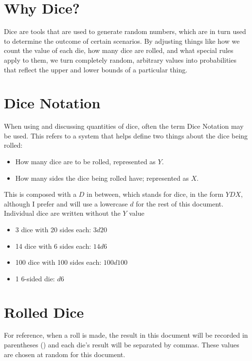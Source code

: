 \documentclass[../main.tex]{subfiles}
\begin{document}
    \section{Why Dice?}

    Dice are tools that are used to generate random numbers, which are in turn used to determine the outcome of certain scenarios. By adjusting things like how we count the value of each die, how many dice are rolled, and what special rules apply to them, we turn completely random, arbitrary values into probabilities that reflect the upper and lower bounds of a particular thing.

    \section{Dice Notation}

    When using and discussing quantities of dice, often the term Dice Notation may be used. This refers to a system that helps define two things about the dice being rolled:

    \begin{itemize}
        \item How many dice are to be rolled, represented as $Y$.
        \item How many sides the dice being rolled have; represented as $X$.
    \end{itemize}

    This is composed with a $D$ in between, which stands for dice, in the form $YDX$, although I prefer and will use a lowercase $d$ for the rest of this document. Individual dice are written without the $Y$ value

    \begin{itemize}
        \item 3 dice with 20 sides each: $3d20$
        \item 14 dice with 6 sides each: $14d6$
        \item 100 dice with 100 sides each: $100d100$
        \item 1 6-sided die: $d6$
    \end{itemize}

    \section{Rolled Dice}

    For reference, when a roll is made, the result in this document will be recorded in parentheses () and each die's result will be separated by commas. These values are chosen at random for this document.
    
\end{document}
